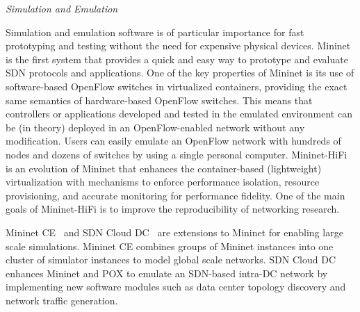 
\vspace{2mm}
\noindent \textit{Simulation and Emulation}

Simulation and emulation software is of particular importance for fast prototyping and testing without the need for expensive physical devices.
Mininet~\cite{lantz2010} is the first system that provides a quick and easy way to prototype and evaluate SDN protocols and applications.
One of the key properties of Mininet is its use of software-based OpenFlow switches in virtualized containers, providing the exact same semantics of hardware-based OpenFlow  switches.
This means that controllers or applications developed and tested in the emulated environment can be (in theory) deployed in an OpenFlow-enabled network without any modification. Users can easily emulate an OpenFlow network with hundreds of nodes and dozens of switches by using a single personal computer.
Mininet-HiFi~\cite{handigol2012} is an evolution of Mininet that enhances the container-based (lightweight) 
virtualization with mechanisms to enforce performance isolation, resource provisioning, and accurate monitoring for 
performance fidelity. 
One of the main goals of Mininet-HiFi is to improve the reproducibility of networking research.

Mininet CE~\cite{antonenko2013} and SDN Cloud DC~\cite{teixeira2013} are extensions 
to Mininet for enabling large scale simulations.
Mininet CE combines groups of Mininet instances into one cluster 
of simulator instances to model global scale networks.
SDN Cloud DC enhances Mininet and POX to emulate an SDN-based 
intra-DC network by implementing new software modules such as data center topology discovery and network traffic generation. 

